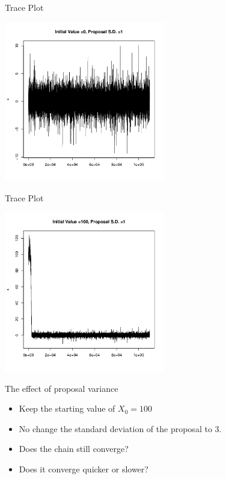 \documentclass[10pt]{beamer}
\begin{document}
\begin{frame}{Trace Plot}
\begin{center}
\includegraphics[height=7cm]{./Pics/sp1.png}
\end{center}
\end{frame}
\begin{frame}{Trace Plot}
\begin{center}
\includegraphics[height=7cm]{./Pics/sp2.png}
\end{center}
\end{frame}
\begin{frame}{The effect of proposal variance}
\begin{itemize}
\item Keep the starting value of $X_0=100$

\item No change the standard deviation of the proposal to 3.

\item Does the chain still converge?

\item Does it converge quicker or slower?
\end{itemize}
\end{frame}
\end{document}
